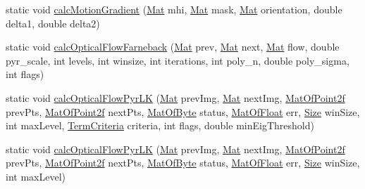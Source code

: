 \begin{DoxyCompactItemize}
\item 
static void \mbox{\hyperlink{classorg_1_1opencv_1_1video_1_1_video_a71bdf0bf465515f5d89eb2e3e11614b3}{calc\+Motion\+Gradient}} (\mbox{\hyperlink{classorg_1_1opencv_1_1core_1_1_mat}{Mat}} mhi, \mbox{\hyperlink{classorg_1_1opencv_1_1core_1_1_mat}{Mat}} mask, \mbox{\hyperlink{classorg_1_1opencv_1_1core_1_1_mat}{Mat}} orientation, double delta1, double delta2)
\item 
static void \mbox{\hyperlink{classorg_1_1opencv_1_1video_1_1_video_a313914fdcd3024f6c5d9519854ac48f3}{calc\+Optical\+Flow\+Farneback}} (\mbox{\hyperlink{classorg_1_1opencv_1_1core_1_1_mat}{Mat}} prev, \mbox{\hyperlink{classorg_1_1opencv_1_1core_1_1_mat}{Mat}} next, \mbox{\hyperlink{classorg_1_1opencv_1_1core_1_1_mat}{Mat}} flow, double pyr\+\_\+scale, int levels, int winsize, int iterations, int poly\+\_\+n, double poly\+\_\+sigma, int flags)
\item 
static void \mbox{\hyperlink{classorg_1_1opencv_1_1video_1_1_video_af905ed0b09b612cdbfd3196135e40ef1}{calc\+Optical\+Flow\+Pyr\+LK}} (\mbox{\hyperlink{classorg_1_1opencv_1_1core_1_1_mat}{Mat}} prev\+Img, \mbox{\hyperlink{classorg_1_1opencv_1_1core_1_1_mat}{Mat}} next\+Img, \mbox{\hyperlink{classorg_1_1opencv_1_1core_1_1_mat_of_point2f}{Mat\+Of\+Point2f}} prev\+Pts, \mbox{\hyperlink{classorg_1_1opencv_1_1core_1_1_mat_of_point2f}{Mat\+Of\+Point2f}} next\+Pts, \mbox{\hyperlink{classorg_1_1opencv_1_1core_1_1_mat_of_byte}{Mat\+Of\+Byte}} status, \mbox{\hyperlink{classorg_1_1opencv_1_1core_1_1_mat_of_float}{Mat\+Of\+Float}} err, \mbox{\hyperlink{classorg_1_1opencv_1_1core_1_1_size}{Size}} win\+Size, int max\+Level, \mbox{\hyperlink{classorg_1_1opencv_1_1core_1_1_term_criteria}{Term\+Criteria}} criteria, int flags, double min\+Eig\+Threshold)
\item 
static void \mbox{\hyperlink{classorg_1_1opencv_1_1video_1_1_video_a009d13895ec508ed780d60688d850b4c}{calc\+Optical\+Flow\+Pyr\+LK}} (\mbox{\hyperlink{classorg_1_1opencv_1_1core_1_1_mat}{Mat}} prev\+Img, \mbox{\hyperlink{classorg_1_1opencv_1_1core_1_1_mat}{Mat}} next\+Img, \mbox{\hyperlink{classorg_1_1opencv_1_1core_1_1_mat_of_point2f}{Mat\+Of\+Point2f}} prev\+Pts, \mbox{\hyperlink{classorg_1_1opencv_1_1core_1_1_mat_of_point2f}{Mat\+Of\+Point2f}} next\+Pts, \mbox{\hyperlink{classorg_1_1opencv_1_1core_1_1_mat_of_byte}{Mat\+Of\+Byte}} status, \mbox{\hyperlink{classorg_1_1opencv_1_1core_1_1_mat_of_float}{Mat\+Of\+Float}} err, \mbox{\hyperlink{classorg_1_1opencv_1_1core_1_1_size}{Size}} win\+Size, int max\+Level)
\item 

\end{DoxyCompactItemize}
